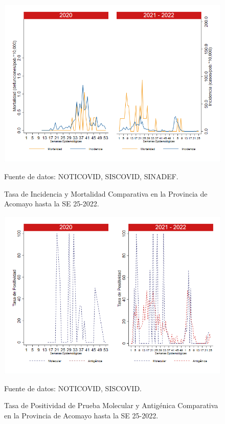 \documentclass[12pt,a4paper,openany]{book}
\begin{document}
	\begin{figure}[h]
		\caption{Tasa de Incidencia y Mortalidad Comparativa en la Provincia de Acomayo hasta la SE 25-2022.}\label{fig:inc_mort_acomayo}
		\begin{center}
			\includegraphics[width=0.70\linewidth]{../figuras/incidencia_mortalidad_20_21_1.png}
		\end{center}
		{\footnotesize {Fuente de datos: NOTICOVID, SISCOVID, SINADEF.}}
	\end{figure}
	
	\begin{figure}[h]
		\caption{Tasa de Positividad de Prueba Molecular y Antigénica Comparativa en la Provincia de Acomayo hasta la SE 25-2022. }\label{fig:positividad_acomayo}
		\begin{center}
			\includegraphics[width=0.7\linewidth]{../figuras/positividad_20_21_1.png}
		\end{center}
		{\footnotesize {Fuente de datos: NOTICOVID, SISCOVID.}}
	\end{figure}
	
\end{document}
